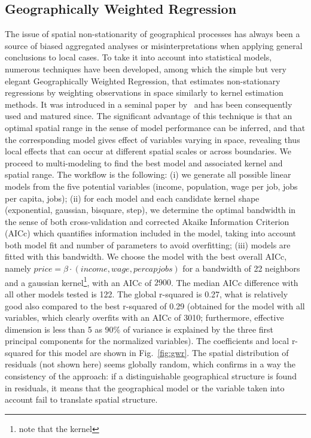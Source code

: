 \documentclass[3p,times,procedia]{elsarticle}
\begin{document}
\subsection{Geographically Weighted Regression}

The issue of spatial non-stationarity of geographical processes has always been a source of biased aggregated analyses or misinterpretations when applying general conclusions to local cases. To take it into account into statistical models, numerous techniques have been developed, among which the simple but very elegant Geographically Weighted Regression, that estimates non-stationary regressions by weighting observations in space similarly to kernel estimation methods. It was introduced in a seminal paper by~\cite{brunsdon1996geographically} and has been consequently used and matured since. The significant advantage of this technique is that an optimal spatial range in the sense of model performance can be inferred, and that the corresponding model gives effect of variables varying in space, revealing thus local effects that can occur at different spatial scales or across boundaries. We proceed to multi-modeling to find the best model and associated kernel and spatial range. The workflow is the following: (i) we generate all possible linear models from the five potential variables (income, population, wage per job, jobs per capita, jobs); (ii) for each model and each candidate kernel shape (exponential, gaussian, bisquare, step), we determine the optimal bandwidth in the sense of both cross-validation and corrected Akaike Information Criterion (AICc) which quantifies information included in the model, taking into account both model fit and number of parameters to avoid overfitting; (iii) models are fitted with this bandwidth. We choose the model with the best overall AICc, namely $price = \beta\cdot\left( income, wage, percapjobs\right)$ for a bandwidth of 22 neighbors and a gaussian kernel\footnote{note that the kernel }, with an AICc of $2900$. The median AICc difference with all other models tested is 122. The global r-squared is 0.27, what is relatively good also compared to the best r-squared of 0.29 (obtained for the model with all variables, which clearly overfits with an AICc of 3010; furthermore, effective dimension is less than 5 as 90\% of variance is explained by the three first principal components for the normalized variables). The coefficients and local r-squared for this model are shown in Fig.~\ref{fig:gwr}. The spatial distribution of residuals (not shown here) seems globally random, which confirms in a way the consistency of the approach: if a distinguishable geographical structure is found in residuals, it means that the geographical model or the variable taken into account fail to translate spatial structure.
\end{document}
